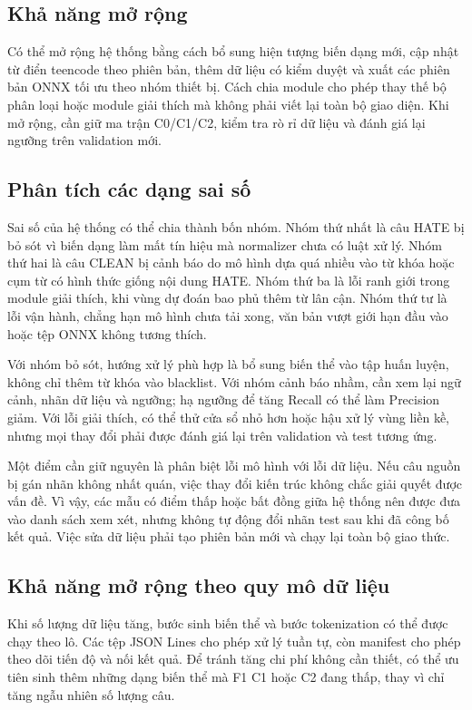 \documentclass[12pt,a4paper]{article}
\begin{document}
\subsection{Khả năng mở rộng}
Có thể mở rộng hệ thống bằng cách bổ sung hiện tượng biến dạng mới, cập nhật từ điển teencode theo phiên bản, thêm dữ liệu có kiểm duyệt và xuất các phiên bản ONNX tối ưu theo nhóm thiết bị. Cách chia module cho phép thay thế bộ phân loại hoặc module giải thích mà không phải viết lại toàn bộ giao diện. Khi mở rộng, cần giữ ma trận C0/C1/C2, kiểm tra rò rỉ dữ liệu và đánh giá lại ngưỡng trên validation mới.

\subsection{Phân tích các dạng sai số}
Sai số của hệ thống có thể chia thành bốn nhóm. Nhóm thứ nhất là câu HATE bị bỏ sót vì biến dạng làm mất tín hiệu mà normalizer chưa có luật xử lý. Nhóm thứ hai là câu CLEAN bị cảnh báo do mô hình dựa quá nhiều vào từ khóa hoặc cụm từ có hình thức giống nội dung HATE. Nhóm thứ ba là lỗi ranh giới trong module giải thích, khi vùng dự đoán bao phủ thêm từ lân cận. Nhóm thứ tư là lỗi vận hành, chẳng hạn mô hình chưa tải xong, văn bản vượt giới hạn đầu vào hoặc tệp ONNX không tương thích.

Với nhóm bỏ sót, hướng xử lý phù hợp là bổ sung biến thể vào tập huấn luyện, không chỉ thêm từ khóa vào blacklist. Với nhóm cảnh báo nhầm, cần xem lại ngữ cảnh, nhãn dữ liệu và ngưỡng; hạ ngưỡng để tăng Recall có thể làm Precision giảm. Với lỗi giải thích, có thể thử cửa sổ nhỏ hơn hoặc hậu xử lý vùng liền kề, nhưng mọi thay đổi phải được đánh giá lại trên validation và test tương ứng.

Một điểm cần giữ nguyên là phân biệt lỗi mô hình với lỗi dữ liệu. Nếu câu nguồn bị gán nhãn không nhất quán, việc thay đổi kiến trúc không chắc giải quyết được vấn đề. Vì vậy, các mẫu có điểm thấp hoặc bất đồng giữa hệ thống nên được đưa vào danh sách xem xét, nhưng không tự động đổi nhãn test sau khi đã công bố kết quả. Việc sửa dữ liệu phải tạo phiên bản mới và chạy lại toàn bộ giao thức.

\subsection{Khả năng mở rộng theo quy mô dữ liệu}
Khi số lượng dữ liệu tăng, bước sinh biến thể và bước tokenization có thể được chạy theo lô. Các tệp JSON Lines cho phép xử lý tuần tự, còn manifest cho phép theo dõi tiến độ và nối kết quả. Để tránh tăng chi phí không cần thiết, có thể ưu tiên sinh thêm những dạng biến thể mà F1 C1 hoặc C2 đang thấp, thay vì chỉ tăng ngẫu nhiên số lượng câu.
\end{document}
